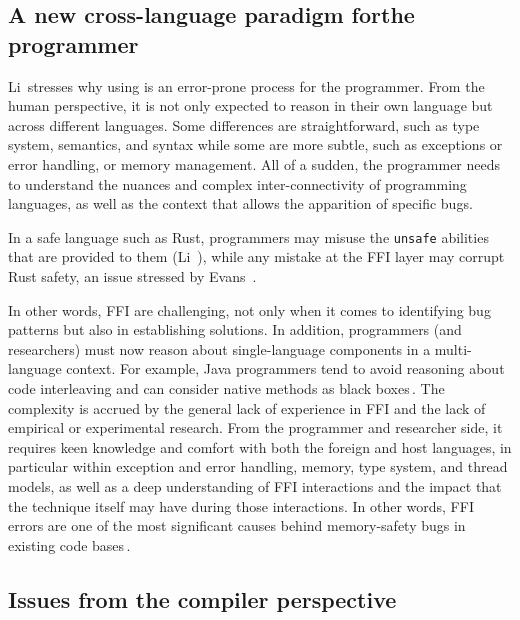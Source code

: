 \documentclass[nomenclature, english, bibtex]{kththesis}
\begin{document}
\subsection[A new cross-language paradigm for the programmer]{A new cross-language paradigm for\linebreak[4] the programmer}

Li\,\cite{li_improving_2014} stresses why using  is an error-prone process for the programmer. From the human perspective, it is not only expected to reason in their own language but across different languages. Some differences are straightforward, such as  type system, semantics, and syntax while some are more subtle, such as exceptions or error handling, or memory management. All of a sudden, the programmer needs to understand the nuances and complex inter-connectivity of programming languages, as well as the context that allows the apparition of specific bugs.

In a safe language such as Rust, programmers may misuse the \texttt{unsafe} abilities that are provided to them (Li \etal\,\cite{li_detecting_2022}), while any mistake at the FFI layer may corrupt Rust safety, an issue stressed by Evans \etal\,\cite{evans_is_2020}.

In other words, FFI are challenging, not only when it comes to identifying bug patterns but also in establishing solutions. In addition, programmers (and researchers) must now reason about single-language components in a multi-language context. 
For example, Java programmers tend to avoid reasoning about code interleaving and can consider native methods as black boxes\,\cite{li_improving_2014}. 
The complexity is accrued by the general lack of experience in FFI and the lack of empirical or experimental research. From the programmer and researcher side, it requires keen knowledge and comfort with both the foreign and host languages, in particular within exception and error handling, memory, type system, and thread models, as well as a deep understanding of FFI interactions and the 
impact that the technique itself may have during those interactions.  In other words, FFI errors are one of the most significant causes behind memory-safety bugs in existing code bases\,\cite{li_improving_2014, patterson_linking_2017}.

\subsection{Issues from the compiler perspective}
\end{document}
